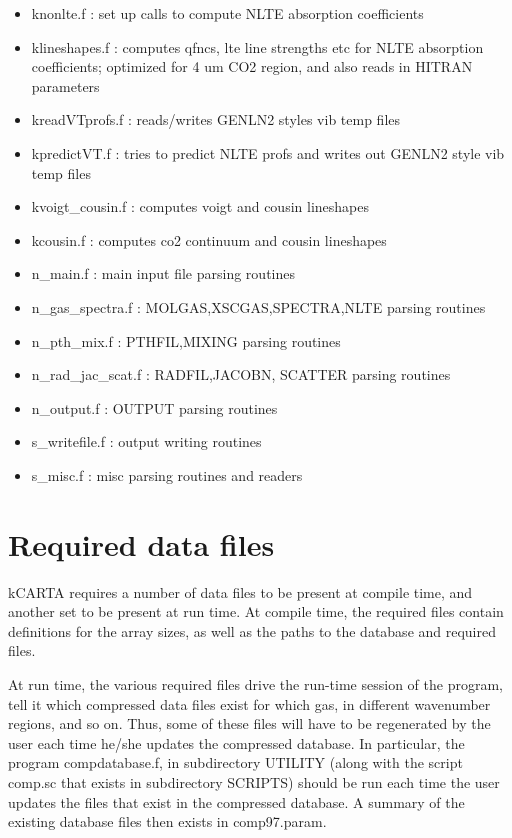 \documentclass[12pt]{article}
\newcommand{\kc}{\textsf{kCARTA}\xspace}
\begin{document}
\begin{itemize}
\item {\sf knonlte.f} : set up calls to compute NLTE absorption coefficients
\item {\sf klineshapes.f}  : computes qfncs, lte line strengths etc for NLTE 
                             absorption coefficients; optimized for 4 um CO2 
                             region, and also reads in HITRAN parameters
\item {\sf kreadVTprofs.f} : reads/writes GENLN2 styles vib temp files
\item {\sf kpredictVT.f}   : tries to predict NLTE profs and writes out GENLN2
                             style vib temp files
\item {\sf kvoigt\_cousin.f}  : computes voigt and cousin lineshapes
\item {\sf kcousin.f}         : computes co2 continuum and cousin lineshapes

\item {\sf n\_main.f} : main input file parsing routines 
\item {\sf n\_gas\_spectra.f} : MOLGAS,XSCGAS,SPECTRA,NLTE parsing routines 
\item {\sf n\_pth\_mix.f} : PTHFIL,MIXING  parsing routines 
\item {\sf n\_rad\_jac\_scat.f} : RADFIL,JACOBN, SCATTER parsing routines 
\item {\sf n\_output.f} : OUTPUT parsing routines 

\item {\sf s\_writefile.f} : output writing routines 
\item {\sf s\_misc.f} : misc parsing routines and readers
\end{itemize}

\section{Required data files}

\kc requires a number of data files to be present at compile time, and
another set to be present at run time.  At compile time, the required files 
contain definitions for the array sizes, as well as the paths to the 
database and required files. 

At run time, the various required files drive the run-time session of the 
program, tell it which compressed data files exist for which gas, in different
wavenumber regions, and so on.  Thus, some of these files will have to be
regenerated by the user each time he/she updates the compressed
database.  In particular, the program compdatabase.f, in subdirectory
{\sf UTILITY} (along with the script comp.sc that exists in
subdirectory {\sf SCRIPTS}) should be run each time the user updates
the files that exist in the compressed database.  A summary of the
existing database files then exists in {\sf comp97.param}.
\end{document}
